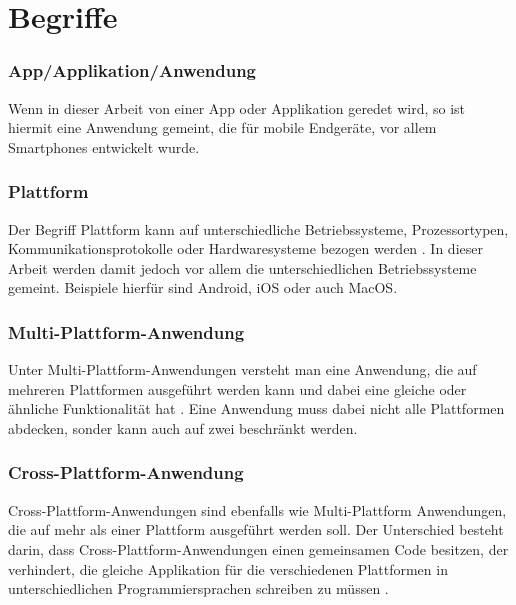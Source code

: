 \section{Begriffe}
\subsubsection{App/Applikation/Anwendung}
Wenn in dieser Arbeit von einer App oder Applikation geredet wird, so ist hiermit eine Anwendung gemeint, die für mobile Endgeräte, vor allem Smartphones entwickelt wurde.
\subsubsection{Plattform}
Der Begriff Plattform kann auf unterschiedliche Betriebssysteme, Prozessortypen, Kommunikationsprotokolle oder Hardwaresysteme bezogen werden \cite{2014Mulit_plattform_definition}. In dieser Arbeit werden damit jedoch vor allem die unterschiedlichen Betriebssysteme gemeint. Beispiele hierfür sind Android, iOS oder auch MacOS. 
\subsubsection{Multi-Plattform-Anwendung}
Unter Multi-Plattform-Anwendungen versteht man eine Anwendung, die auf mehreren Plattformen ausgeführt werden kann und dabei eine gleiche oder ähnliche Funktionalität hat \cite{2014Mulit_plattform_definition}. Eine Anwendung muss dabei nicht alle Plattformen abdecken, sonder kann auch auf zwei beschränkt werden.
\subsubsection{Cross-Plattform-Anwendung}
Cross-Plattform-Anwendungen sind ebenfalls wie Multi-Plattform Anwendungen, die auf mehr als einer Plattform ausgeführt werden soll. Der Unterschied besteht darin, dass Cross-Plattform-Anwendungen einen gemeinsamen Code besitzen, der verhindert, die gleiche Applikation für die verschiedenen Plattformen in unterschiedlichen Programmiersprachen schreiben zu müssen \cite{2014_Cross_plattform}.